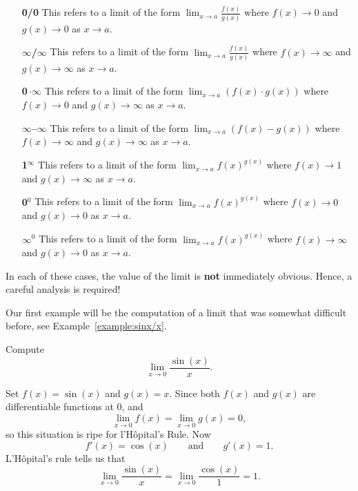 \begin{definition}\hfil
\begin{itemize}
\item[\textbf{0/0}] This refers to a limit of the form $\lim_{x\to a}
  \frac{f(x)}{g(x)}$ where $f(x)\to 0$ and $g(x)\to 0$ as $x\to a$.
\item[\textbf{$\pmb\infty$/$\pmb\infty$}] This refers to a limit of the form $\lim_{x\to a}
  \frac{f(x)}{g(x)}$ where $f(x)\to \infty$ and $g(x)\to \infty$ as $x\to a$.
\item[\textbf{0\,$\pmb{\cdot\infty}$}] This refers to a limit of the form $\lim_{x\to a}
  \left(f(x)\cdot g(x)\right)$ where $f(x)\to 0$ and $g(x)\to \infty$ as $x\to a$.
\item[\textbf{$\pmb\infty$--$\pmb\infty$}] This refers to a limit of the form $\lim_{x\to a}\left(
  f(x)-g(x)\right)$ where $f(x)\to \infty$ and $g(x)\to \infty$ as $x\to a$.

\item[\textbf{1$^{\pmb\infty}$}] This refers to a limit of the form $\lim_{x\to a}
  f(x)^{g(x)}$ where $f(x)\to 1$ and $g(x)\to \infty$ as $x\to a$.
\item[\textbf{0$^\text{0}$}] This refers to a limit of the form $\lim_{x\to a}
  f(x)^{g(x)}$ where $f(x)\to 0$ and $g(x)\to 0$ as $x\to a$.
\item[\textbf{$\pmb\infty^\text{0}$}] This refers to a limit of the form $\lim_{x\to a}
  f(x)^{g(x)}$ where $f(x)\to \infty$ and $g(x)\to 0$ as $x\to a$.
\end{itemize}
In each of these cases, the value of the limit is \textbf{not} immediately
obvious. Hence, a careful analysis is required!
\end{definition}

Our first example will be the computation of a limit that was somewhat
difficult before, see Example~\ref{example:sinx/x}.

\begin{example}[0/0]\label{example:sinx/x-lhopital}
Compute
\[
\lim_{x\to 0} \frac{\sin(x)}{x}.
\]
\end{example}

\begin{solution}
Set $f(x) = \sin(x)$ and $g(x) = x$.  Since both $f(x)$ and $g(x)$ are
differentiable functions at $0$, and 
\[
\lim_{x \to 0} f(x) = \lim_{x \to 0}g(x) = 0,
\]
so this situation is ripe for l'H\^opital's Rule. Now 
\[
f'(x) = \cos(x) \qquad\text{and}\qquad g'(x) = 1.
\] 
L'H\^opital's rule tells us that 
\[
\lim_{x \to 0} \frac{\sin(x)}{x} = \lim_{x \to 0} \frac{\cos(x)}{1} = 1.
\]
\end{solution}


